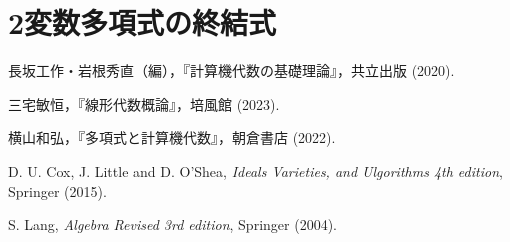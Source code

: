 \documentclass[12pt, uplatex, dvipdfmx]{jsarticle}
\theoremstyle{definition}
\begin{document}
\newpage

\section{2変数多項式の終結式}


\begin{thebibliography}{99}
 長坂工作・岩根秀直（編），『計算機代数の基礎理論』，共立出版 (2020).

 三宅敏恒，『線形代数概論』，培風館 (2023).

 横山和弘，『多項式と計算機代数』，朝倉書店 (2022).

 D. U. Cox, J. Little and D. O'Shea, \textit{Ideals Varieties, and Ulgorithms 4th edition}, Springer (2015).

 S. Lang, \textit{Algebra Revised 3rd edition}, Springer (2004). 
\end{thebibliography}
\end{document}
